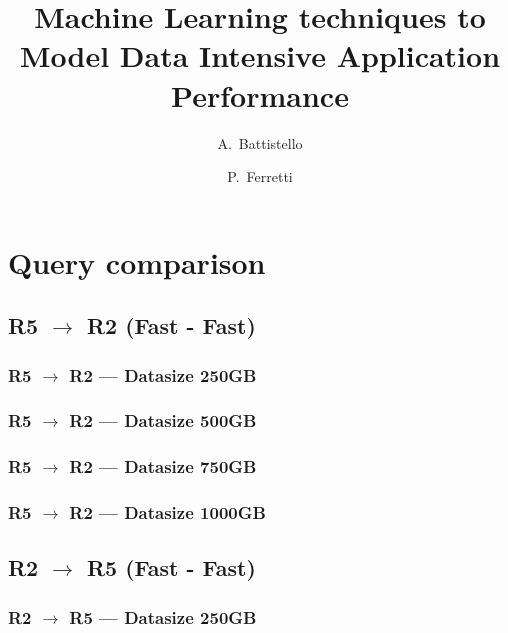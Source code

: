\documentclass[a4paper,11pt]{article}
\author{A.~Battistello\and P.~Ferretti}
\title{Machine Learning techniques to Model Data Intensive Application Performance}
\date{}
\begin{document}
\maketitle
\tableofcontents

\newpage
\section{Query comparison}
\subsection{R5 $\rightarrow$ R2 (Fast - Fast)}
\subsubsection{R5 $\rightarrow$ R2 --- Datasize 250GB}



\newpage
\subsubsection{R5 $\rightarrow$ R2 --- Datasize 500GB}



\newpage
\subsubsection{R5 $\rightarrow$ R2 --- Datasize 750GB}



\newpage
\subsubsection{R5 $\rightarrow$ R2 --- Datasize 1000GB}



\newpage


\subsection{R2 $\rightarrow$ R5 (Fast - Fast)}
\subsubsection{R2 $\rightarrow$ R5 --- Datasize 250GB}


\end{document}
